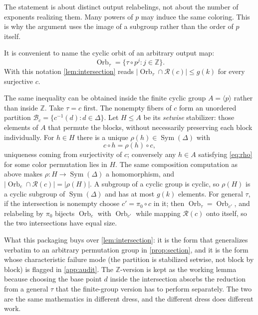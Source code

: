 \documentclass[11pt,a4paper]{article}
\numberwithin{equation}{section}
\theoremstyle{definition}
\theoremstyle{remark}
\newcommand{\Z}{\mathbb Z}
\newcommand{\D}{\Delta}
\newcommand{\Sym}{\operatorname{Sym}}
\newcommand{\Orb}{\operatorname{Orb}}
\begin{document}
The statement is about distinct output relabelings, not about the number of
exponents realizing them. Many powers of $p$ may induce the same coloring.
This is why the argument uses the image of a subgroup rather than the order
of $p$ itself.

It is convenient to name the cyclic orbit of an arbitrary output map:
\begin{equation}\label{eq:orbnotation}
 \Orb_\tau=\{\tau\circ p^j:j\in\Z\}.
\end{equation}
With this notation \cref{lem:intersection} reads
$|\Orb_\tau\cap\mathcal R(c)|\le g(k)$ for every surjective $c$.

\begin{remark}\label{rem:setwise}
The same inequality can be obtained inside the finite cyclic group
$A=\langle p\rangle$ rather than inside $\Z$. Take $\tau=c$ first. The
nonempty fibers of $c$ form an unordered partition
$\mathcal B_c=\{c^{-1}(d):d\in\D\}$. Let $H\le A$ be its \emph{setwise}
stabilizer: those elements of $A$ that permute the blocks, without
necessarily preserving each block individually. For $h\in H$ there is a
unique $\rho(h)\in\Sym(\D)$ with
\begin{equation}\label{eq:rho}
 c\circ h=\rho(h)\circ c,
\end{equation}
uniqueness coming from surjectivity of $c$; conversely any $h\in A$
satisfying \eqref{eq:rho} for some color permutation lies in $H$. The same
composition computation as above makes $\rho:H\to\Sym(\D)$ a homomorphism,
and $|\Orb_c\cap\mathcal R(c)|=|\rho(H)|$. A subgroup of a cyclic group is
cyclic, so $\rho(H)$ is a cyclic subgroup of $\Sym(\D)$ and has at most
$g(k)$ elements. For general $\tau$, if the intersection is nonempty choose
$c'=\pi_0\circ c$ in it; then $\Orb_\tau=\Orb_{c'}$, and relabeling by
$\pi_0$ bijects $\Orb_c$ with $\Orb_{c'}$ while mapping $\mathcal R(c)$ onto
itself, so the two intersections have equal size.

What this packaging buys over \cref{lem:intersection}: it is the form that
generalizes verbatim to an arbitrary permutation group in
\cref{prop:section}, and it is the form whose characteristic failure mode
(the partition is stabilized setwise, not block by block) is flagged in
\cref{app:audit}. The $\Z$-version is kept as the working lemma because
choosing the base point $d$ inside the intersection absorbs the reduction
from a general $\tau$ that the finite-group version has to perform
separately. The two are the same mathematics in different dress, and the
different dress does different work.
\end{remark}
\end{document}
